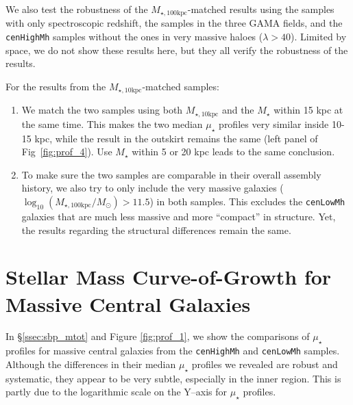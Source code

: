 \documentclass[a4paper,fleqn,usenatbib]{mnras}
\def\rbcg{\texttt{cenHighMh}}
\def\nbcg{\texttt{cenLowMh}}
\def\mstar{{$M_{\star}$}}
\def\minn{{$M_{\star,10\mathrm{kpc}}$}}
\def\mtot{{$M_{\star,100\mathrm{kpc}}$}}
\def\logmtot{{$\log_{10} (M_{\star,100\mathrm{kpc}}/M_{\odot})$}}
\def\mden{{$\mu_{\star}$}}
\begin{document}
    We also test the robustness of the \mtot{}-matched results using the samples with 
    only spectroscopic redshift, the samples in the three GAMA fields, and the \rbcg{} 
    samples without the ones in very massive haloes ($\lambda > 40$).  
    Limited by space, we do not show these results here, but they all verify the 
    robustness of the results. 
    
    For the results from the \minn{}-matched samples: 
    
    \begin{enumerate}
    
        \item
            We match the two samples using both \minn{} and the \mstar{} within 15 kpc 
            at the same time.  
            This makes the two median \mden{} profiles very similar inside 10-15 
            kpc, while the result in the outskirt remains the same (left panel of 
            Fig~\ref{fig:prof_4}).
            Use \mstar{} within 5 or 20 kpc leads to the same conclusion. 
          
        \item 
            To make sure the two samples are comparable in their overall assembly history,
            we also try to only include the very massive galaxies (\logmtot{}$>11.5$)
            in both samples. 
            This excludes the \nbcg{} galaxies that are much less massive and 
            more ``compact'' in structure. 
            Yet, the results regarding the structural differences remain the same. 
          
    \end{enumerate}

\section{Stellar Mass Curve-of-Growth for Massive Central Galaxies} 
	\label{app:cog}
	
	In \S \ref{ssec:sbp_mtot} and Figure \ref{fig:prof_1}, we show the comparisons 
	of \mden{} profiles for massive central galaxies from the \rbcg{} and \nbcg{} 
	samples. 
	Although the differences in their median \mden{} profiles we revealed are robust 
	and systematic, they appear to be very subtle, especially in the inner region. 
	This is partly due to the logarithmic scale on the Y--axis for \mden{} profiles. 
	
\end{document}
